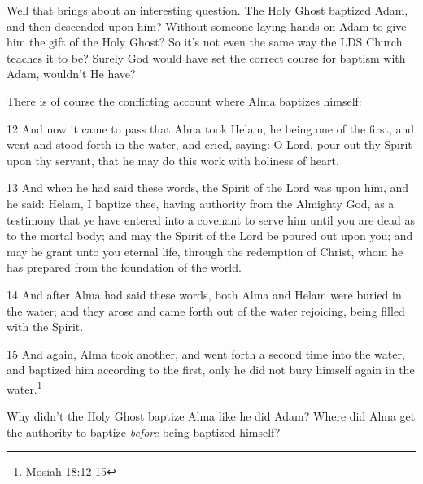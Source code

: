 Well that brings about an interesting question. The Holy Ghost baptized Adam, and
then descended upon him? Without someone laying hands on Adam to give him the gift of
the Holy Ghost? So it's not even the same way the LDS Church teaches it to be? Surely
God would have set the correct course for baptism with Adam, wouldn't He have?

There is of course the conflicting account where Alma baptizes himself:

\begin{displayquote}
12 And now it came to pass that Alma took Helam, he being one of the first, and went 
and stood forth in the water, and cried, saying: O Lord, pour out thy Spirit upon thy 
servant, that he may do this work with holiness of heart.

13 And when he had said these words, the Spirit of the Lord was upon him, and he 
said: Helam, I baptize thee, having authority from the Almighty God, as a testimony 
that ye have entered into a covenant to serve him until you are dead as to the mortal 
body; and may the Spirit of the Lord be poured out upon you; and may he grant unto 
you eternal life, through the redemption of Christ, whom he has prepared from the 
foundation of the world.

14 And after Alma had said these words, both Alma and Helam were buried in the 
water; and they arose and came forth out of the water rejoicing, being filled with 
the Spirit.

15 And again, Alma took another, and went forth a second time into the water, and 
baptized him according to the first, only he did not bury himself again in the 
water.\footnote{Mosiah 18:12-15}
\end{displayquote}

Why didn't the Holy Ghost baptize Alma like he did Adam? Where did Alma get the
authority to baptize \textit{before} being baptized himself?